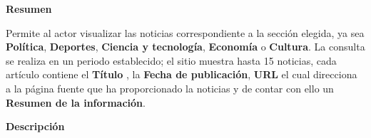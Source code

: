 

\begin{large}
	\textbf{Resumen}\\
\end{large}

Permite al actor visualizar las noticias correspondiente a la sección elegida,
ya sea \textbf{Política}, \textbf{Deportes}, \textbf{Ciencia y tecnología}, \textbf{Economía}
o \textbf{Cultura}. La consulta se realiza en un periodo establecido; el sitio muestra hasta 15
 noticias, cada artículo contiene el \textbf{Título} , la \textbf{Fecha de publicación}, \textbf{URL} el cual direcciona a la página fuente que ha proporcionado la noticias y de contar con ello  un
\textbf{Resumen de la información}.\\

\begin{large}
	\textbf{Descripción}\\
\end{large}




